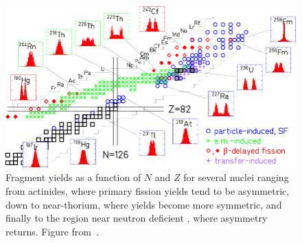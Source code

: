 

\begin{figure}
	\centering
	\includegraphics[width=0.9\linewidth]{./TeX_files/178Pt_region}
	\caption{Fragment yields as a function of $N$ and $Z$ for several nuclei ranging from actinides, where primary fission yields tend to be asymmetric, down to near-thorium, where yields become more symmetric, and finally to the region near neutron deficient {\Hg}, where asymmetry returns. Figure from~\cite{Andreyev2018}.}
	\label{fig:178ptregion}
\end{figure}



